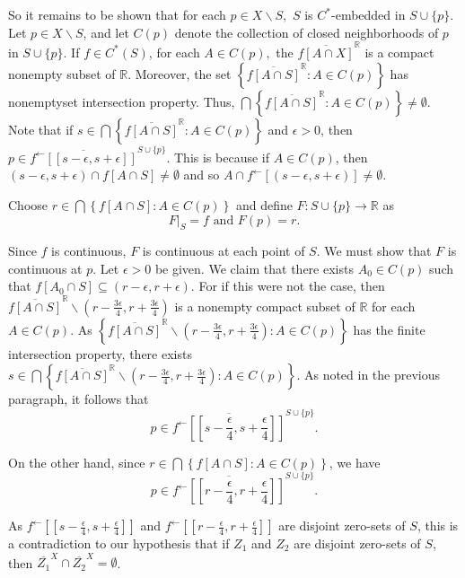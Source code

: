 \documentclass{article}
\begin{document}
So it remains to be shown that for each $p\in X\backslash S,$ $S$ is $C^*$-embedded in $S\cup \{p\}$. Let $p\in X\backslash S$, and let $C(p)$ denote the collection of closed neighborhoods of $p$ in $S\cup \{p\}.$ If $f\in C^*(S)$, for each $A\in C(p),$ the $\overline{f\left[A\cap X\right]}^{\mathbb{R}}$ is a compact nonempty subset of $\mathbb{R}$. Moreover, the set $\left\{\overline{f\left[A\cap S\right]}^{\mathbb{R}}: A\in C(p)\right\}$ has nonemptyset intersection property. Thus,  $\bigcap\left\{\overline{f\left[A\cap S\right]}^{\mathbb{R}}: A\in C(p)\right\}\neq \emptyset$. Note that if $s\in \bigcap\left\{ \overline{f[A\cap S]}^{\mathbb{R}}: A\in C(p)\right\}$ and $\epsilon>0$, then $p\in \overline{f^\leftarrow \left[ [s-\epsilon, s+\epsilon]\right]}^{S\cup \{p\}}$. This is because if $A\in C(p)$, then $(s-\epsilon, s+\epsilon)\cap f[A\cap S]\neq \emptyset$ and so $A\cap f^\leftarrow \left[(s-\epsilon, s+\epsilon)\right]\neq \emptyset.$ 

\vskip 20pt
 
Choose $r\in \bigcap \left\{f[A\cap S]: A\in C(p)\right\}$ and define $F:S\cup \{p\} \rightarrow \mathbb{R}$ as
$$ F|_S=f \mbox{ and } F(p)=r.$$

Since $f$ is continuous, $F$ is continuous at each point of $S$. We must show that $F$ is continuous at $p$. Let $\epsilon>0$ be given.
We claim that there exists $A_0\in C(p)$ such that $f\left[A_0\cap S\right] \subseteq (r-\epsilon, r+\epsilon).$ For if this were not the case, then $\overline{f\left[A\cap S\right]}^{\mathbb{R}}\backslash (r-\frac{3\epsilon}{4}, r+\frac{3\epsilon}{4})$ is a nonempty compact subset of $\mathbb{R}$ for each $A\in C(p).$ As $\left\{\overline{f[A\cap S]}^{\mathbb{R}}\backslash (r-\frac{3\epsilon}{4}, r+\frac{3\epsilon}{4}): A\in C(p)\right\}$ has the finite intersection property, there exists $s\in \bigcap \left\{\overline{f[A\cap S]}^{\mathbb{R}}\backslash (r-\frac{3\epsilon}{4}, r+\frac{3\epsilon}{4}): A\in C(p)\right\}$. As noted in the previous paragraph, it follows that $$p\in \overline{f^\leftarrow\left[[s-\frac{\epsilon}{4},s+\frac{\epsilon}{4}]\right]}^{S\cup \{p\}}.$$


\vskip 10pt

On the other hand, since $r\in \bigcap \left\{f[A\cap S]: A\in C(p)\right\}$, we have $$p\in \overline{f^\leftarrow \left[[r-\frac{\epsilon}{4}, r+\frac{\epsilon}{4}]\right] }^{S\cup \{p\}}.$$

\vskip 15pt


As  $f^\leftarrow\left[[s-\frac{\epsilon}{4},s+\frac{\epsilon}{4}]\right]$ and $f^\leftarrow \left[[r-\frac{\epsilon}{4}, r+\frac{\epsilon}{4}]\right]$ are disjoint zero-sets of $S$, this is a contradiction to our hypothesis that if $Z_1$ and $Z_2$ are disjoint zero-sets of $S$, then $\overline{Z_1}^X\cap \overline{Z_2}^X=\emptyset$. 
\end{document}
